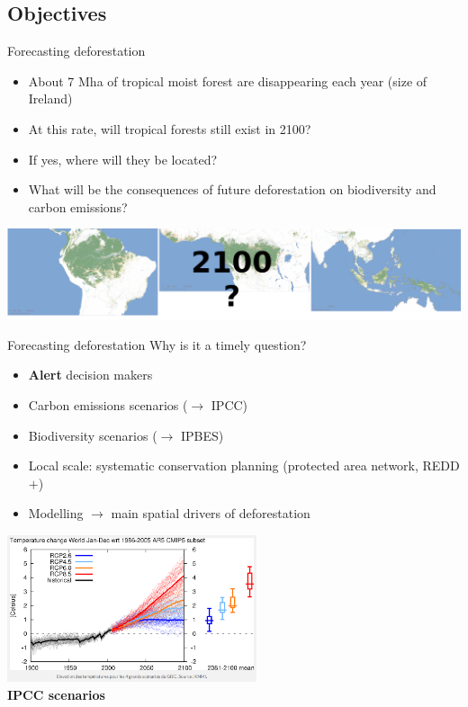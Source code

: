 \documentclass[10pt,table,dvipsnames,compress]{beamer}
\begin{document}
\subsection{Objectives}
\label{sec:org32a5111}
\begin{frame}[label={sec:orgd62c374}]{Forecasting deforestation}
\begin{itemize}
\item About 7 Mha of tropical moist forest are disappearing each year (size
of Ireland)
\item At this rate, will tropical forests still exist in 2100?
\item If yes, where will they be located?
\item What will be the consequences of future deforestation on biodiversity
and carbon emissions?
\end{itemize}

\vspace{0.5cm}
\centering \includegraphics[width=\textwidth]{figs/Vancutsem2021-maps-2100}
\end{frame}

\begin{frame}[label={sec:org64bf647}]{Forecasting deforestation}
Why is it a timely question?

\begin{itemize}
\item \textbf{Alert} decision makers
\item Carbon emissions scenarios (\(\rightarrow\) IPCC)
\item Biodiversity scenarios (\(\rightarrow\) IPBES)
\item Local scale: systematic conservation planning (protected area network,
REDD\(+\))
\item Modelling \(\rightarrow\) main spatial drivers of deforestation
\end{itemize}

\vspace{0.10cm}
\centering \includegraphics[width=0.55\textwidth]{figs/ipcc.png}\\[0pt]
\textbf{IPCC scenarios}
\end{frame}
\end{document}
